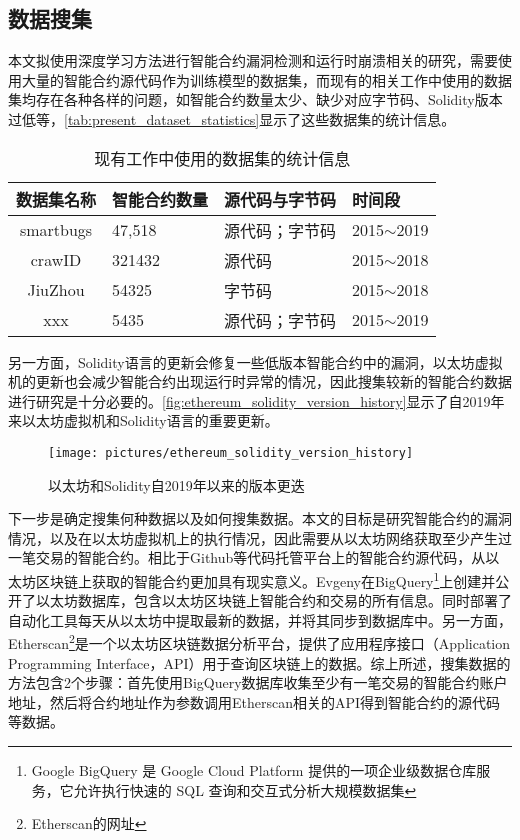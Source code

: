 \subsection{数据搜集}
本文拟使用深度学习方法进行智能合约漏洞检测和运行时崩溃相关的研究，需要使用大量的智能合约源代码作为训练模型的数据集，而现有的相关工作中使用的数据集均存在各种各样的问题，如智能合约数量太少、缺少对应字节码、Solidity版本过低等，\autoref{tab:present_dataset_statistics}显示了这些数据集的统计信息。
\begin{table}[htbp]
    \caption{\label{tab:present_dataset_statistics}现有工作中使用的数据集的统计信息}
    \small
    \renewcommand{\arraystretch}{1.5}
    \begin{tabularx}{\linewidth}{cX<{\centering}X<{\centering}X<{\centering}}
        \hline
    数据集名称     & 智能合约数量 & 源代码与字节码 & 时间段            \\ \hline
    smartbugs & 47,518  & 源代码；字节码 & 2015$\sim$2019 \\
    crawID    & 321432 & 源代码     & 2015$\sim$2018 \\
    JiuZhou   & 54325  & 字节码     & 2015$\sim$2018 \\
    xxx       & 5435   & 源代码；字节码 & 2015$\sim$2019  \\  \hline
    \end{tabularx}
\end{table}
另一方面，Solidity语言的更新会修复一些低版本智能合约中的漏洞，以太坊虚拟机的更新也会减少智能合约出现运行时异常的情况，因此搜集较新的智能合约数据进行研究是十分必要的。\autoref{fig:ethereum_solidity_version_history}显示了自2019年来以太坊虚拟机和Solidity语言的重要更新。
\begin{figure}[htbp]
    \centering
    \texttt{[image: pictures/ethereum\_solidity\_version\_history]}
    \caption{\label{fig:ethereum_solidity_version_history}以太坊和Solidity自2019年以来的版本更迭}
\end{figure}
下一步是确定搜集何种数据以及如何搜集数据。本文的目标是研究智能合约的漏洞情况，以及在以太坊虚拟机上的执行情况，因此需要从以太坊网络获取至少产生过一笔交易的智能合约。相比于Github等代码托管平台上的智能合约源代码，从以太坊区块链上获取的智能合约更加具有现实意义。Evgeny\cite{bigquery_ethereum}在BigQuery\footnote{Google BigQuery 是 Google Cloud Platform 提供的一项企业级数据仓库服务，它允许执行快速的 SQL 查询和交互式分析大规模数据集}上创建并公开了以太坊数据库，包含以太坊区块链上智能合约和交易的所有信息。同时部署了自动化工具每天从以太坊中提取最新的数据，并将其同步到数据库中。另一方面，Etherscan\footnote{Etherscan的网址}是一个以太坊区块链数据分析平台，提供了应用程序接口（Application Programming Interface，API）用于查询区块链上的数据。综上所述，搜集数据的方法包含2个步骤：首先使用BigQuery数据库收集至少有一笔交易的智能合约账户地址，然后将合约地址作为参数调用Etherscan相关的API得到智能合约的源代码等数据。
